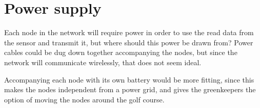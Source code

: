 \section{Power supply}

Each node in the network will require power in order to use the read data from the sensor and transmit it, but where should this power be drawn from? Power cables could be dug down together accompanying the nodes, but since the network will communicate wirelessly, that does not seem ideal.

Accompanying each node with its own battery would be more fitting, since this makes the nodes independent from a power grid, and gives the greenkeepers the option of moving the nodes around the golf course. 


%
%	
%
%
%
%
%	
%
